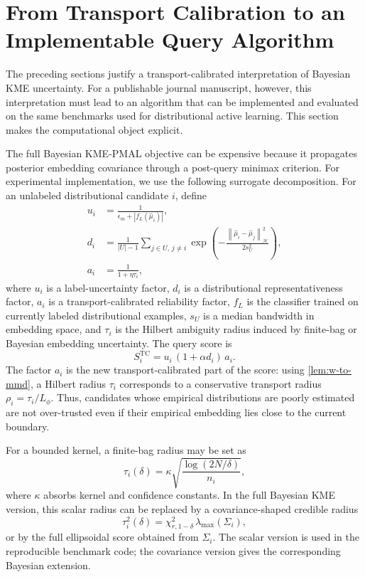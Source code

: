\documentclass[10pt,journal]{IEEEtran}
\newcommand{\Hcal}{\mathcal{H}}
\newcommand{\wh}{\widehat}
\newcommand{\norm}[1]{\left\lVert #1 \right\rVert}
\begin{document}
\section{From Transport Calibration to an Implementable Query Algorithm}
\label{sec:algorithm}

The preceding sections justify a transport-calibrated interpretation of Bayesian KME uncertainty. For a publishable journal manuscript, however, this interpretation must lead to an algorithm that can be implemented and evaluated on the same benchmarks used for distributional active learning. This section makes the computational object explicit.

The full Bayesian KME-PMAL objective can be expensive because it propagates posterior embedding covariance through a post-query minimax criterion. For experimental implementation, we use the following surrogate decomposition. For an unlabeled distributional candidate $i$, define
\begin{align}
    u_i &= \frac{1}{\epsilon_m+|f_L(\wh\mu_i)|}, \\
    d_i &= \frac{1}{|U|-1}\sum_{j\in U,\,j\ne i}\exp\left(-\frac{\norm{\wh\mu_i-\wh\mu_j}_{\Hcal}^2}{2s_U^2}\right), \\
    a_i &= \frac{1}{1+\eta\tau_i},
\end{align}
where $u_i$ is a label-uncertainty factor, $d_i$ is a distributional representativeness factor, $a_i$ is a transport-calibrated reliability factor, $f_L$ is the classifier trained on currently labeled distributional examples, $s_U$ is a median bandwidth in embedding space, and $\tau_i$ is the Hilbert ambiguity radius induced by finite-bag or Bayesian embedding uncertainty. The query score is
\begin{equation}
\label{eq:tc-score}
    S_i^{\mathrm{TC}} = u_i\,(1+\alpha d_i)\,a_i.
\end{equation}
The factor $a_i$ is the new transport-calibrated part of the score: using \cref{lem:w-to-mmd}, a Hilbert radius $\tau_i$ corresponds to a conservative transport radius $\rho_i=\tau_i/L_\phi$. Thus, candidates whose empirical distributions are poorly estimated are not over-trusted even if their empirical embedding lies close to the current boundary.

For a bounded kernel, a finite-bag radius may be set as
\begin{equation}
\label{eq:simple-radius}
    \tau_i(\delta)=\kappa\sqrt{\frac{\log(2N/\delta)}{n_i}},
\end{equation}
where $\kappa$ absorbs kernel and confidence constants. In the full Bayesian KME version, this scalar radius can be replaced by a covariance-shaped credible radius
\begin{equation}
\label{eq:bayes-radius-alg}
    \tau_i^2(\delta)=\chi^2_{r,1-\delta}\,\lambda_{\max}(\Sigma_i),
\end{equation}
or by the full ellipsoidal score obtained from $\Sigma_i$. The scalar version is used in the reproducible benchmark code; the covariance version gives the corresponding Bayesian extension.
\end{document}
